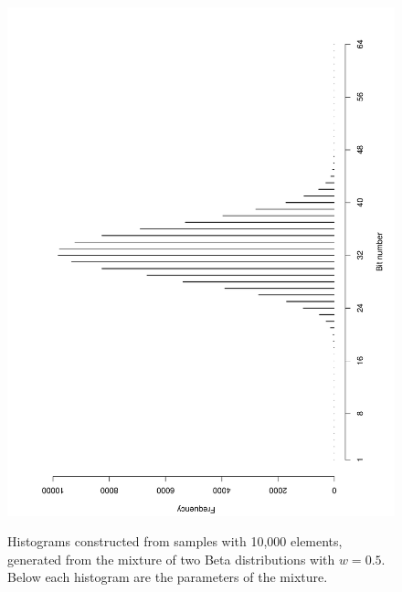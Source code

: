\documentclass[10pt]{article}
\begin{document}
\begin{figure}[h]
{  \includegraphics[scale=0.28,angle=-90]{fig12}
  }
  \caption{Histograms constructed from samples with 10,000 elements, generated from the mixture of two Beta distributions with $w=0.5$. Below each histogram are the parameters of the mixture.}
  \label{fig:09101112}
\end{figure}
\end{document}
